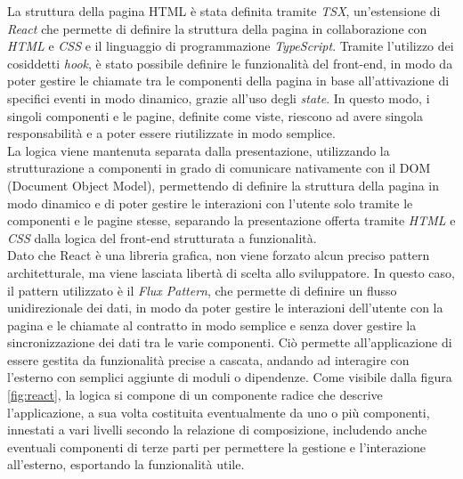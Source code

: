 La struttura della pagina HTML è stata definita tramite \textit{TSX}, un'estensione di \textit{React} che permette di definire la struttura della pagina 
in collaborazione con \textit{HTML} e \textit{CSS} e il linguaggio di programmazione \textit{TypeScript}.
Tramite l'utilizzo dei cosiddetti \textit{hook}, è stato possibile definire le funzionalità del front-end, in modo da poter gestire le chiamate tra le componenti della 
pagina in base all'attivazione di specifici eventi in modo dinamico, grazie all'uso degli \textit{state}.
In questo modo, i singoli componenti e le pagine, definite come viste, riescono ad avere singola responsabilità e a poter essere riutilizzate in modo semplice. \\

La logica viene mantenuta separata dalla presentazione, utilizzando la strutturazione a componenti in grado di comunicare nativamente con il 
DOM (Document Object Model), permettendo di definire la struttura della pagina in modo dinamico e di poter gestire le interazioni con l'utente
solo tramite le componenti e le pagine stesse, separando la presentazione offerta tramite \textit{HTML} e \textit{CSS} dalla logica del front-end strutturata
a funzionalità. \\

Dato che React è una libreria grafica, non viene forzato alcun preciso pattern architetturale, ma viene lasciata libertà di scelta allo sviluppatore.
In questo caso, il pattern utilizzato è il \textit{Flux Pattern}, che permette di definire un flusso unidirezionale dei dati, in modo da poter gestire
le interazioni dell'utente con la pagina e le chiamate al contratto in modo semplice e senza dover gestire la sincronizzazione dei dati tra le varie componenti.
Ciò permette all'applicazione di essere gestita da funzionalità precise a cascata, andando ad interagire con l'esterno con semplici aggiunte di moduli o dipendenze.
Come visibile dalla figura \ref{fig:react}, la logica si compone di un componente radice che descrive l'applicazione,
a sua volta costituita eventualmente da uno o più componenti, innestati a vari livelli secondo la relazione di composizione,
includendo anche eventuali componenti di terze parti per permettere la gestione e l'interazione all'esterno, esportando la funzionalità utile.

